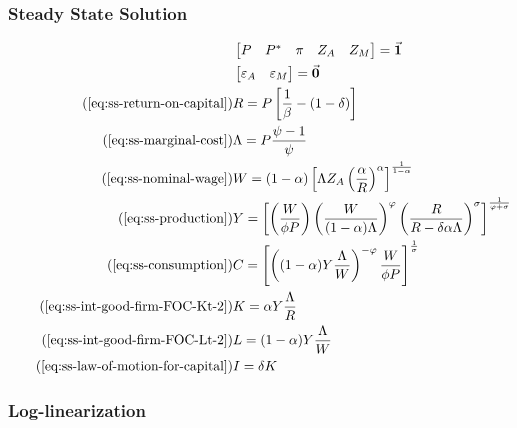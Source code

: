 \documentclass[
thesis.tex
]{subfiles}
\begin{document}
	
	\subsubsection{Steady State Solution}
	
	\vspace*{-1cm}
	
	\begin{align}
		\label{eq:unity-vector}
		& \begin{bmatrix}
			P & P^\ast & \pi & Z_A & Z_M
		\end{bmatrix} = \vec{\bm{1}} \\
		\label{eq:null-vector}
		& \begin{bmatrix}
			\varepsilon_A & \varepsilon_{M}
		\end{bmatrix} = \vec{\bm{0}}\\
		\tag{\ref{eq:ss-return-on-capital}}
		& R = P\left[ \frac{1}{\beta} - (1-\delta) \right] \\
		\tag{\ref{eq:ss-marginal-cost}}
		& \Lambda = P \frac{\psi-1}{\psi} \\
		\tag{\ref{eq:ss-nominal-wage}}
		& W = (1-\alpha) \left[ \Lambda Z_{A} \left( \frac{\alpha}{R} \right)^{\alpha} \right]^\frac{1}{1-\alpha} \\
		\tag{\ref{eq:ss-production}}
		& Y =\left[
		\left( \frac{W}{\phi P}                \right)
		\left( \frac{W}{(1-\alpha)\Lambda}     \right)^\varphi
		\left( \frac{R}{R-\delta\alpha\Lambda} \right)^\sigma
		\right]^\frac{1}{\varphi+\sigma} \\
		\tag{\ref{eq:ss-consumption}}
		& C = \left[ \left( (1-\alpha) Y \frac{\Lambda}{W} \right)^{-\varphi} \frac{W}{\phi P} \right]^{\frac{1}{\sigma}} \\
		\tag{\ref{eq:ss-int-good-firm-FOC-Kt-2}}
		& K = \alpha Y \frac{\Lambda}{R} \\
		\tag{\ref{eq:ss-int-good-firm-FOC-Lt-2}}
		& L = (1-\alpha) Y \frac{\Lambda}{W} \\
		\tag{\ref{eq:ss-law-of-motion-for-capital}}
		& I = \delta K
	\end{align}
	
	
	
	\subsubsection{Log-linearization}
	
\end{document}
